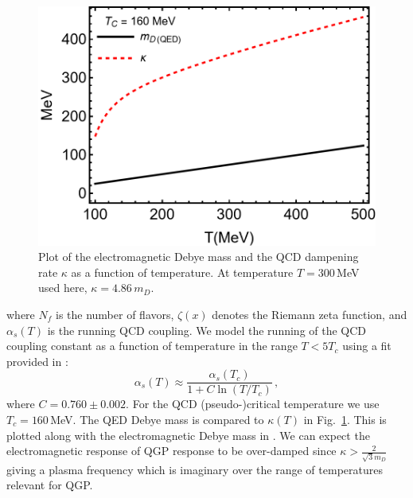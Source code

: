 \begin{figure}[ht]
    \centering
    \includegraphics[width=0.85\linewidth]{plots/chap02QCD/kappaDEBYE.png}
    \caption{Plot of the electromagnetic Debye mass and the QCD dampening rate $\kappa$ as a function of temperature. At temperature $T=300\,$MeV used here, $\kappa = 4.86\, m_D$. }
    \label{fig:kappaDebye}
\end{figure}

where $N_f$ is the number of flavors, $\zeta(x)$ denotes the Riemann zeta function, and $\alpha_s(T)$ is the running QCD coupling.  We model the running of the QCD coupling constant as a function of temperature in the range $T<5T_c$ using a fit provided in \cite{Letessier:2002ony}:
\begin{equation}\label{eq:alphas}
    \alpha_s(T) \approx \frac{\alpha_s(T_c)}{1+C \ln(T/T_c)}\,,
\end{equation}
where $C=0.760 \pm 0.002$. For the QCD (pseudo-)critical temperature we use $T_c = 160\,$MeV. The QED Debye mass is compared to $\kappa(T)$ in Fig.~\ref{fig:kappaDebye}. 
This is plotted along with the electromagnetic Debye mass in . We can expect the electromagnetic response of QGP response to be over-damped since $\kappa> \frac{2}{\sqrt{3} m_D}$ giving a plasma frequency  which is imaginary over the range of temperatures relevant for QGP.


